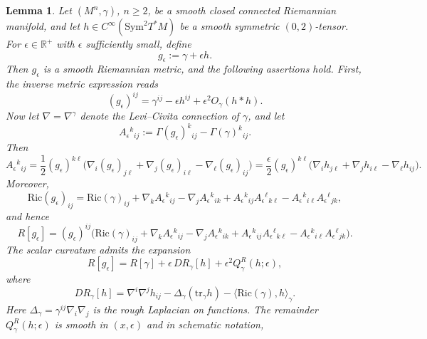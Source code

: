 \documentclass{amsart}
\newtheorem{lemma}{Lemma}[section]
\newcommand{\tr}{\mbox{tr}}
\begin{document}
\begin{lemma}
\label{nonlinearexpansion}
Let $(M^{n},\gamma)$, $n\geq 2$, be a smooth closed connected Riemannian manifold, and let
$h\in C^\infty(\text{Sym}^2T^*M)$ be a smooth symmetric $(0,2)$-tensor. For $\epsilon\in\mathbb R^{+}$
with $\epsilon$ sufficiently small, define
\[
g_\epsilon:=\gamma+\epsilon h.
\]
Then $g_\epsilon$ is a smooth Riemannian metric, and the following assertions hold. First, the inverse metric expression reads
\begin{equation}\label{eq:inverse-expansion}
(g_{\epsilon})^{ij}
=
\gamma^{ij}
-
\epsilon h^{ij}
+
\epsilon^{2}O_{\gamma}(h*h).
\end{equation}
\medskip
\noindent Now let $\nabla=\nabla^\gamma$ denote the Levi--Civita connection of $\gamma$, and let
\[
A_\epsilon{}^{k}{}_{ij}
:=
\Gamma(g_\epsilon)^{k}{}_{ij}-\Gamma(\gamma)^{k}{}_{ij}.
\]
Then
\begin{equation}
\label{eq:A-exact}
A_\epsilon{}^{k}{}_{ij}
=
\frac12 (g_\epsilon)^{k\ell}
\big(
\nabla_i(g_\epsilon)_{j\ell}
+\nabla_j(g_\epsilon)_{i\ell}
-\nabla_\ell(g_\epsilon)_{ij}
\big)
=
\frac{\epsilon}{2}(g_\epsilon)^{k\ell}
\big(
\nabla_i h_{j\ell}
+\nabla_j h_{i\ell}
-\nabla_\ell h_{ij}
\big).
\end{equation}
Moreover,
\begin{equation}
\label{eq:Ric-exact}
\text{Ric}(g_\epsilon)_{ij}
=
\text{Ric}(\gamma)_{ij}
+\nabla_k A_\epsilon{}^{k}{}_{ij}
-\nabla_j A_\epsilon{}^{k}{}_{ik}
+A_\epsilon{}^{k}{}_{ij}A_\epsilon{}^{\ell}{}_{k\ell}
-A_\epsilon{}^{k}{}_{i\ell}A_\epsilon{}^{\ell}{}_{jk},
\end{equation}
and hence
\begin{equation}
\label{eq:R-exact}
R[g_\epsilon]
=
(g_\epsilon)^{ij}
\Big(
\text{Ric}(\gamma)_{ij}
+\nabla_k A_\epsilon{}^{k}{}_{ij}
-\nabla_j A_\epsilon{}^{k}{}_{ik}
+A_\epsilon{}^{k}{}_{ij}A_\epsilon{}^{\ell}{}_{k\ell}
-A_\epsilon{}^{k}{}_{i\ell}A_\epsilon{}^{\ell}{}_{jk}
\Big).
\end{equation}
\noindent The scalar curvature admits the expansion
\begin{equation}
\label{eq:R-linearization-expansion}
R[g_\epsilon]
=
R[\gamma]+\epsilon\,DR_\gamma[h]+\epsilon^2 Q^R_\gamma(h;\epsilon),
\end{equation}
where
\begin{equation}
\label{eq:DR}
DR_\gamma[h]
=
\nabla^i\nabla^j h_{ij}
-\Delta_\gamma(\tr_\gamma h)
-\langle \text{Ric}(\gamma),h\rangle_\gamma.
\end{equation}
Here $\Delta_\gamma=\gamma^{ij}\nabla_i\nabla_j$ is the rough Laplacian on functions. The remainder $Q^R_\gamma(h;\epsilon)$ is smooth in $(x,\epsilon)$ and in schematic notation,

\end{lemma}
\end{document}

